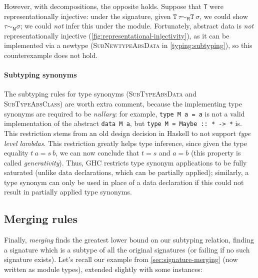 However, with decompositions, the opposite holds. Suppose that \verb|T|
were representationally injective: under the signature, given
$\texttt{T}~\tau \sim_\textsf{R} \texttt{T}~\sigma$, we could
show $\tau \sim_\textsf{N} \sigma$; we could \emph{not} infer
this under the module.
Fortunately, abstract data is \emph{not}
representationally injective (\cref{fig:representational-injectivity}), as it can be implemented via
a newtype (\textsc{SubNewtypeAbsData} in \cref{typing:subtyping}),
so this counterexample does not hold.

\paragraph{Subtyping synonyms}
The subtyping rules for type synonyms (\textsc{SubTypeAbsData} and
\textsc{SubTypeAbsClass}) are worth extra comment, because the implementing
type synonyms are required to be \emph{nullary}: for example, \verb|type M a = a|
is not a valid implementation of the abstract \verb|data M a|,
but \verb|type M = Maybe :: * -> *| is.  This restriction
stems from an old design decision in Haskell to not support \emph{type level
lambdas}.  This restriction greatly helps type inference, since given the
type equality $t~a = s~b$, we can now conclude that $t = s$ and $a = b$
(this property is called \emph{generativity}).  Thus, GHC restricts type
synonym applications to be fully saturated (unlike data declarations, which can
be partially applied); similarly, a type synonym can only be used in place
of a data declaration if this could not result in partially applied type
synonyms.

\subsection{Merging rules}
\label{sec:typing/merging}



Finally, \emph{merging} finds the greatest lower bound on our subtyping relation,
finding a signature which is a subtype of all the original signatures (or failing
if no such signature exists).  Let's recall our example from \cref{sec:signature-merging}
(now written as module types), extended slightly with some instances:

